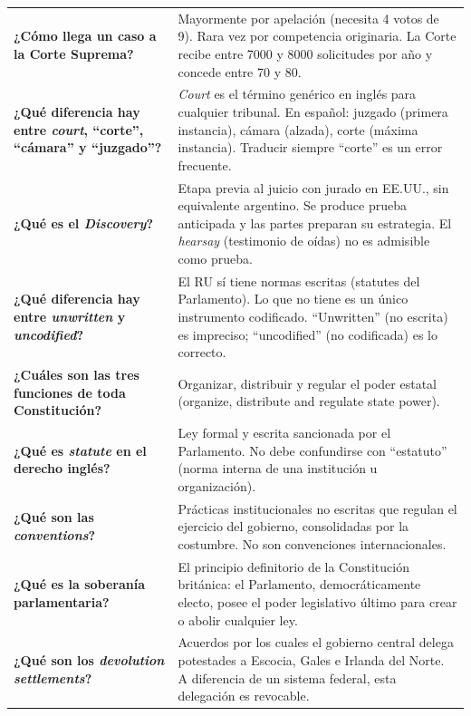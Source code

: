 \documentclass[12pt,oneside]{book}
\begin{document}
\begin{longtable}{
    >{\raggedright\arraybackslash}p{}
    >{\raggedright\arraybackslash}p{}
}
\textbf{¿Cómo llega un caso a la Corte Suprema?} &
Mayormente por apelación (necesita 4 votos de 9). Rara vez por competencia originaria. La Corte recibe entre 7000 y 8000 solicitudes por año y concede entre 70 y 80. \\

\textbf{¿Qué diferencia hay entre \textit{court}, ``corte'', ``cámara'' y ``juzgado''?} &
\textit{Court} es el término genérico en inglés para cualquier tribunal. En español: juzgado (primera instancia), cámara (alzada), corte (máxima instancia). Traducir siempre ``corte'' es un error frecuente. \\

\textbf{¿Qué es el \textit{Discovery}?} &
Etapa previa al juicio con jurado en EE.UU., sin equivalente argentino. Se produce prueba anticipada y las partes preparan su estrategia. El \textit{hearsay} (testimonio de oídas) no es admisible como prueba. \\

\textbf{¿Qué diferencia hay entre \textit{unwritten} y \textit{uncodified}?} &
El RU sí tiene normas escritas (statutes del Parlamento). Lo que no tiene es un único instrumento codificado. ``Unwritten'' (no escrita) es impreciso; ``uncodified'' (no codificada) es lo correcto. \\

\textbf{¿Cuáles son las tres funciones de toda Constitución?} &
Organizar, distribuir y regular el poder estatal (organize, distribute and regulate state power). \\

\textbf{¿Qué es \textit{statute} en el derecho inglés?} &
Ley formal y escrita sancionada por el Parlamento. No debe confundirse con ``estatuto'' (norma interna de una institución u organización). \\

\textbf{¿Qué son las \textit{conventions}?} &
Prácticas institucionales no escritas que regulan el ejercicio del gobierno, consolidadas por la costumbre. No son convenciones internacionales. \\

\textbf{¿Qué es la soberanía parlamentaria?} &
El principio definitorio de la Constitución británica: el Parlamento, democráticamente electo, posee el poder legislativo último para crear o abolir cualquier ley. \\

\textbf{¿Qué son los \textit{devolution settlements}?} &
Acuerdos por los cuales el gobierno central delega potestades a Escocia, Gales e Irlanda del Norte. A diferencia de un sistema federal, esta delegación es revocable. \\


\end{longtable}
\end{document}
